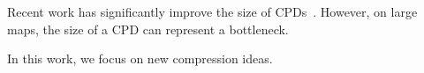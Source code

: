 Recent work has significantly improve the size of CPDs~\cite{strasser-et-al-2014,DBLP:conf/aips/SalvettiBSG17}. However, on large maps, the size of a CPD can represent a bottleneck.

In this work, we focus on new compression ideas.


